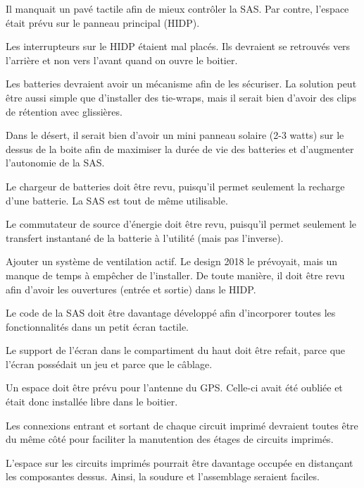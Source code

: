 Il manquait un pavé tactile afin de mieux contrôler la SAS. Par contre,
l’espace était prévu sur le panneau principal (HIDP).
\par
Les interrupteurs sur le HIDP étaient mal placés. Ils devraient se retrouvés
vers l’arrière et non vers l’avant quand on ouvre le boitier.
\par
Les batteries devraient avoir un mécanisme afin de les sécuriser. La solution
peut être aussi simple que d’installer des tie-wraps, mais il serait bien
d’avoir des clips de rétention avec glissières.
\par
Dans le désert, il serait bien d’avoir un mini panneau solaire (2-3 watts) sur
le dessus de la boite afin de maximiser la durée de vie des batteries et
d’augmenter l’autonomie de la SAS.
\par
Le chargeur de batteries doit être revu, puisqu’il permet seulement la recharge
d’une batterie. La SAS est tout de même utilisable.
\par
Le commutateur de source d’énergie doit être revu, puisqu’il permet seulement
le transfert instantané de la batterie à l’utilité (mais pas l’inverse).
\par
Ajouter un système de ventilation actif. Le design 2018 le prévoyait, mais un
manque de temps à empêcher de l’installer. De toute manière, il doit être revu
afin d’avoir les ouvertures (entrée et sortie) dans le HIDP.
\par
Le code de la SAS doit être davantage développé afin d’incorporer toutes les
fonctionnalités dans un petit écran tactile.
\par
Le support de l’écran dans le compartiment du haut doit être refait, parce que
l’écran possédait un jeu et parce que le câblage.
\par
Un espace doit être prévu pour l’antenne du GPS. Celle-ci avait été oubliée et
était donc installée libre dans le boitier.
\par
Les connexions entrant et sortant de chaque circuit imprimé devraient toutes
être du même côté pour faciliter la manutention des étages de circuits imprimés.
\par
L’espace sur les circuits imprimés pourrait être davantage occupée en
distançant les composantes dessus. Ainsi, la soudure et l’assemblage seraient
faciles.

